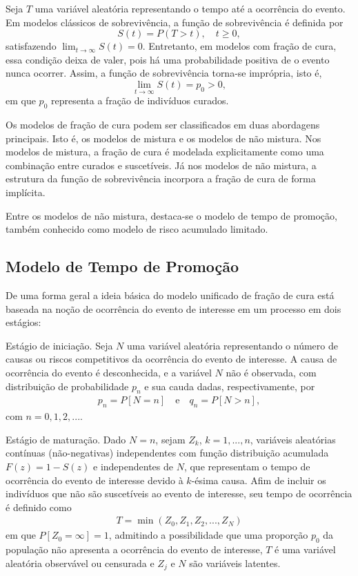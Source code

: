 Seja $T$ uma variável aleatória representando o tempo até a ocorrência do evento. Em modelos clássicos de sobrevivência,
a função de sobrevivência é definida por
\[
S(t)=P(T>t), \quad t\geq 0,
\]
satisfazendo $\lim_{t\to\infty}S(t)=0$. Entretanto, em modelos com fração de cura, essa condição deixa de valer, pois
há uma probabilidade positiva de o evento nunca ocorrer. Assim, a função de sobrevivência torna-se imprópria, isto é,
\[
\lim_{t\to\infty}S(t)=p_0 > 0,
\]
em que $p_0$ representa a fração de indivíduos curados.


Os modelos de fração de cura podem ser classificados em duas abordagens principais. Isto é, os modelos de mistura e os modelos de não mistura. Nos modelos de mistura,
a fração de cura é modelada explicitamente como uma combinação entre curados e suscetíveis. Já nos modelos de não mistura,
a estrutura da função de sobrevivência incorpora a fração de cura de forma implícita.

Entre os modelos de não mistura, destaca-se o modelo de tempo de promoção,
também conhecido como modelo de risco acumulado limitado.

\subsection{Modelo de Tempo de Promoção}

De uma forma geral a ideia básica do modelo unificado de fração de cura está baseada na noção de ocorrência do evento de interesse em um processo em dois estágios:

Estágio de iniciação. Seja $N$ uma variável aleatória representando o número de causas ou riscos competitivos da ocorrência do evento de interesse. A causa de ocorrência do evento é desconhecida, e a variável $N$ não é observada, com distribuição de probabilidade $p_n$ e sua cauda dadas, respectivamente, por
\begin{eqnarray}
p_n=P[N=n] \quad \text{e} \quad q_n=P[N>n],
\end{eqnarray}
com $n=0,1,2,...$.

Estágio de maturação. Dado $N=n$, sejam $Z_k$, $k=1,...,n$, variáveis aleatórias contínuas (não-negativas) independentes com função distribuição acumulada $F(z)=1-S(z)$ e independentes de $N$, que representam o tempo de ocorrência do evento de interesse devido à $k$-ésima causa.
Afim de incluir os indivíduos que não são suscetíveis ao evento de interesse, seu tempo de ocorrência é definido como
\begin{eqnarray}
T = \min(Z_0,Z_1,Z_2, ...,Z_N)
\end{eqnarray}
em que $P[Z_0 = \infty] = 1$, admitindo a possibilidade que uma proporção $p_0$ da população não apresenta a ocorrência do evento de interesse, $T$ é uma variável aleatória observável ou censurada e $Z_j$ e $N$ são variáveis latentes.

